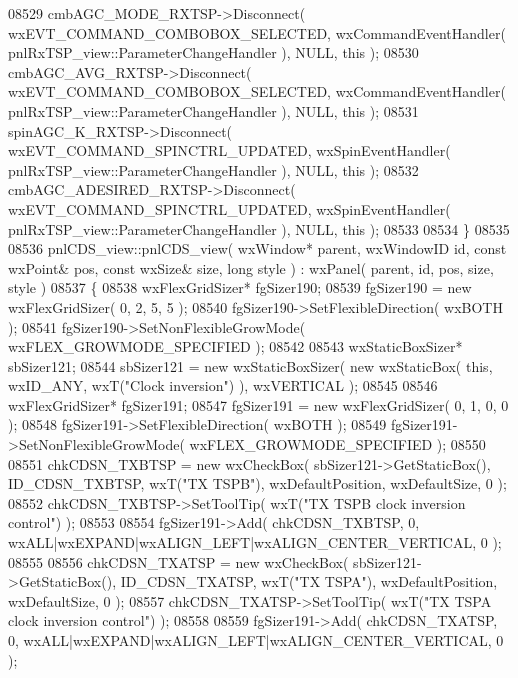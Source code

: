 \begin{DoxyCode}
08529     cmbAGC_MODE_RXTSP->Disconnect( wxEVT\_COMMAND\_COMBOBOX\_SELECTED, wxCommandEventHandler( 
      pnlRxTSP_view::ParameterChangeHandler ), NULL, \textcolor{keyword}{this} );
08530     cmbAGC_AVG_RXTSP->Disconnect( wxEVT\_COMMAND\_COMBOBOX\_SELECTED, wxCommandEventHandler( 
      pnlRxTSP_view::ParameterChangeHandler ), NULL, \textcolor{keyword}{this} );
08531     spinAGC_K_RXTSP->Disconnect( wxEVT\_COMMAND\_SPINCTRL\_UPDATED, wxSpinEventHandler( 
      pnlRxTSP_view::ParameterChangeHandler ), NULL, \textcolor{keyword}{this} );
08532     cmbAGC_ADESIRED_RXTSP->Disconnect( wxEVT\_COMMAND\_SPINCTRL\_UPDATED, wxSpinEventHandler( 
      pnlRxTSP_view::ParameterChangeHandler ), NULL, \textcolor{keyword}{this} );
08533     
08534 \}
08535 
08536 pnlCDS_view::pnlCDS_view( wxWindow* parent, wxWindowID \textcolor{keywordtype}{id}, \textcolor{keyword}{const} wxPoint& pos, \textcolor{keyword}{const} wxSize& 
      size, \textcolor{keywordtype}{long} style ) : wxPanel( parent, id, pos, size, style )
08537 \{
08538     wxFlexGridSizer* fgSizer190;
08539     fgSizer190 = \textcolor{keyword}{new} wxFlexGridSizer( 0, 2, 5, 5 );
08540     fgSizer190->SetFlexibleDirection( wxBOTH );
08541     fgSizer190->SetNonFlexibleGrowMode( wxFLEX\_GROWMODE\_SPECIFIED );
08542     
08543     wxStaticBoxSizer* sbSizer121;
08544     sbSizer121 = \textcolor{keyword}{new} wxStaticBoxSizer( \textcolor{keyword}{new} wxStaticBox( \textcolor{keyword}{this}, wxID\_ANY, wxT(\textcolor{stringliteral}{"Clock inversion"}) ), 
      wxVERTICAL );
08545     
08546     wxFlexGridSizer* fgSizer191;
08547     fgSizer191 = \textcolor{keyword}{new} wxFlexGridSizer( 0, 1, 0, 0 );
08548     fgSizer191->SetFlexibleDirection( wxBOTH );
08549     fgSizer191->SetNonFlexibleGrowMode( wxFLEX\_GROWMODE\_SPECIFIED );
08550     
08551     chkCDSN_TXBTSP = \textcolor{keyword}{new} wxCheckBox( sbSizer121->GetStaticBox(), ID_CDSN_TXBTSP, wxT(\textcolor{stringliteral}{"TX TSPB"}), 
      wxDefaultPosition, wxDefaultSize, 0 );
08552     chkCDSN_TXBTSP->SetToolTip( wxT(\textcolor{stringliteral}{"TX TSPB clock inversion control"}) );
08553     
08554     fgSizer191->Add( chkCDSN_TXBTSP, 0, wxALL|wxEXPAND|wxALIGN\_LEFT|wxALIGN\_CENTER\_VERTICAL, 0 );
08555     
08556     chkCDSN_TXATSP = \textcolor{keyword}{new} wxCheckBox( sbSizer121->GetStaticBox(), ID_CDSN_TXATSP, wxT(\textcolor{stringliteral}{"TX TSPA"}), 
      wxDefaultPosition, wxDefaultSize, 0 );
08557     chkCDSN_TXATSP->SetToolTip( wxT(\textcolor{stringliteral}{"TX TSPA clock inversion control"}) );
08558     
08559     fgSizer191->Add( chkCDSN_TXATSP, 0, wxALL|wxEXPAND|wxALIGN\_LEFT|wxALIGN\_CENTER\_VERTICAL, 0 );

\end{DoxyCode}

